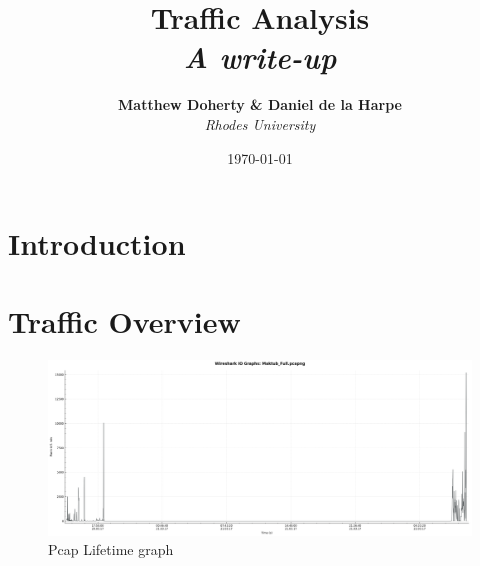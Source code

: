 \documentclass[11pt]{diazessay} %
\title{\textbf{Traffic Analysis} \\ {\Large\itshape A write-up}} %
\author{\textbf{Matthew Doherty \& Daniel de la Harpe} \\ \textit{Rhodes University}} %
\date{\today} %
\begin{document}
\maketitle %



\renewcommand{\thesection}{\arabic{section}}
\renewcommand{\thesubsection}{\arabic{subsection}}
\renewcommand{\thesubsubsection}{\arabic{subsubsection}}
\renewcommand{\thesubsection}{\thesection.\arabic{subsection}}
\renewcommand{\thesubsubsection}{\thesubsection.\arabic{subsubsection}}

\vspace{30pt} %



\section{Introduction}




\section{Traffic Overview}

\begin{figure}[H]
        \centering
        \includegraphics[scale=0.30]{Maktub_Full.png}
    \caption{Pcap Lifetime graph}
\end{figure}
\end{document}

